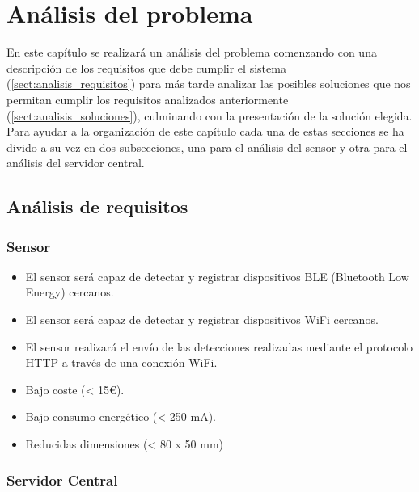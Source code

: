 \documentclass[../proyecto.tex]{subfiles}
\begin{document}
\chapter{Análisis del problema}\label{chap:analisis_del_problema}

En este capítulo se realizará un análisis del problema comenzando con una descripción de los requisitos que debe cumplir el sistema (\autoref{sect:analisis_requisitos}) para más tarde analizar las posibles soluciones que nos permitan cumplir los requisitos analizados anteriormente (\autoref{sect:analisis_soluciones}), culminando con la presentación de la solución elegida. Para ayudar a la organización de este capítulo cada una de estas secciones se ha divido a su vez en dos subsecciones, una para el análisis del sensor y otra para el análisis del servidor central.\\

\section{Análisis de requisitos}\label{sect:analisis_requisitos}

\subsection{Sensor}

\begin{itemize}
  \item El sensor será capaz de detectar y registrar dispositivos BLE (Bluetooth Low Energy) cercanos.
  \item El sensor será capaz de detectar y registrar dispositivos WiFi cercanos.
  \item El sensor realizará el envío de las detecciones realizadas mediante el protocolo HTTP a través de una conexión WiFi.
\end{itemize}

\begin{itemize}
  \item Bajo coste (< 15€).
  \item Bajo consumo energético (< 250 mA).
  \item Reducidas dimensiones (< 80 x 50 mm)
\end{itemize}


\subsection{Servidor Central}
\end{document}
